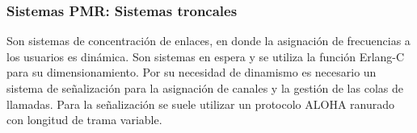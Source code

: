 \subsubsection{Sistemas PMR: Sistemas troncales}
\label{ssub:troncales}
	Son sistemas de concentración de enlaces, en donde la asignación de frecuencias a los usuarios es dinámica. Son sistemas en espera y se utiliza la función Erlang-C para su dimensionamiento. Por su necesidad de dinamismo es necesario un sistema de señalización para la asignación de canales y la gestión de las colas de llamadas. Para la señalización se suele utilizar un protocolo ALOHA ranurado con longitud de trama variable.\\
	
